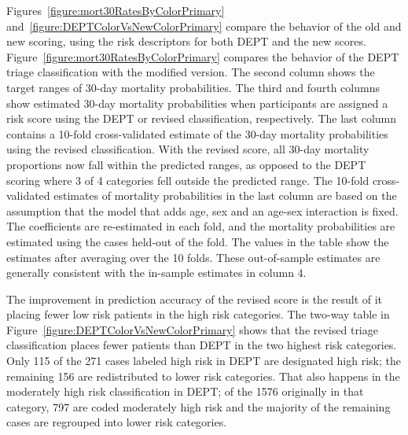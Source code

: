 Figures~\ref{figure:mort30RatesByColorPrimary} and~\ref{figure:DEPTColorVsNewColorPrimary} compare the behavior of the old and new scoring, using the risk descriptors for both DEPT and the new scores.   Figure~\ref{figure:mort30RatesByColorPrimary} compares the behavior of the DEPT triage classification with the modified version.  The second column shows the target ranges of 30-day mortality probabilities.  The third and fourth columns show estimated 30-day mortality probabilities when participants are assigned a risk score using the DEPT or revised classification, respectively.  The last column contains a 10-fold cross-validated estimate of the 30-day mortality probabilities using the revised classification. With the revised score, all 30-day mortality proportions now fall within the predicted ranges, as opposed to the DEPT scoring where 3 of 4 categories fell outside the predicted range.  The 10-fold cross-validated estimates of mortality probabilities in the last column are based on the assumption that the model that adds age, sex and an age-sex interaction is fixed.  The coefficients are re-estimated in each fold, and the mortality probabilities are estimated using the cases held-out of the fold.  The values in the table show the estimates after averaging over the 10 folds.  These out-of-sample estimates are generally consistent with the in-sample estimates in column 4.

The improvement in prediction accuracy of the revised score is the result of it placing fewer low risk patients in the high risk categories.  The two-way table in Figure~\ref{figure:DEPTColorVsNewColorPrimary} shows that the revised triage classification places fewer patients than DEPT in the two highest risk categories.  Only 115 of the 271 cases labeled high risk in DEPT are designated high risk; the remaining 156 are redistributed to lower risk categories.  That also happens in the moderately high risk classification in DEPT; of the 1576 originally in that category, 797 are coded moderately high risk and the majority of the remaining cases are regrouped into lower risk categories. 


